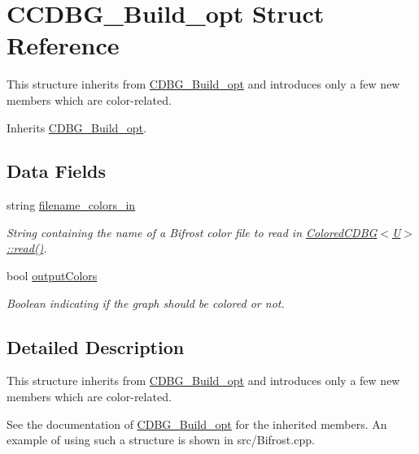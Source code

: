\hypertarget{structCCDBG__Build__opt}{}\section{C\+C\+D\+B\+G\+\_\+\+Build\+\_\+opt Struct Reference}
\label{structCCDBG__Build__opt}


This structure inherits from \hyperlink{structCDBG__Build__opt}{C\+D\+B\+G\+\_\+\+Build\+\_\+opt} and introduces only a few new members which are color-\/related.  




Inherits \hyperlink{structCDBG__Build__opt}{C\+D\+B\+G\+\_\+\+Build\+\_\+opt}.

\subsection*{Data Fields}
\begin{DoxyCompactItemize}
\item 
string \hyperlink{structCCDBG__Build__opt_a5a0ffdd2103dcc0087f99731dcbcdc9f}{filename\+\_\+colors\+\_\+in}
\begin{DoxyCompactList}\small\item\em String containing the name of a Bifrost color file to read in \hyperlink{classColoredCDBG_a513ae8190f56a26b088a99e1e33689d8}{Colored\+C\+D\+B\+G$<$\+U$>$\+::read()}. \end{DoxyCompactList}\item 
bool \hyperlink{structCCDBG__Build__opt_a8139bdba04c0dbb93c653c9a451b05f6}{output\+Colors}
\begin{DoxyCompactList}\small\item\em Boolean indicating if the graph should be colored or not. \end{DoxyCompactList}\end{DoxyCompactItemize}


\subsection{Detailed Description}
This structure inherits from \hyperlink{structCDBG__Build__opt}{C\+D\+B\+G\+\_\+\+Build\+\_\+opt} and introduces only a few new members which are color-\/related. 

See the documentation of \hyperlink{structCDBG__Build__opt}{C\+D\+B\+G\+\_\+\+Build\+\_\+opt} for the inherited members. An example of using such a structure is shown in src/\+Bifrost.\+cpp. 

